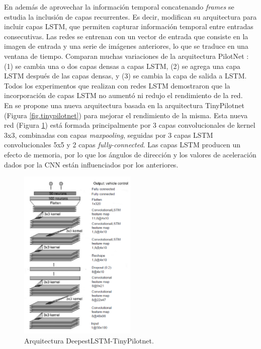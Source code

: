En \cite{pixels} además de aprovechar la información temporal concatenando \textit{frames} se estudia la inclusión de capas recurrentes. Es decir, modifican su arquitectura para incluir capas LSTM, que permiten capturar información temporal entre entradas consecutivas. Las redes se entrenan con un vector de entrada que consiste en la imagen de entrada y una serie de imágenes anteriores, lo que se traduce en una ventana de tiempo. Comparan muchas variaciones de la arquitectura PilotNet \cite{end2end}: (1) se cambia una o dos capas densas a capas LSTM, (2) se agrega una capa LSTM después de las capas densas, y (3) se cambia la capa de salida a LSTM. Todos los experimentos que realizan con redes LSTM demostraron que la incorporación de capas LSTM no aumentó ni redujo el rendimiento de la red.\\

En \cite{self-driving} se propone una nueva arquitectura basada en la arquitectura TinyPilotnet (Figura \ref{fig.tinypilotnet}) para mejorar el rendimiento de la misma. Esta nueva red (Figura \ref{fig.deepestlstm}) está formada principalmente por 3 capas convolucionales de kernel 3x3, combinadas con capas \textit{maxpooling}, seguidas por 3 capas LSTM convolucionales 5x5 y 2 capas \textit{fully-connected}. Las capas LSTM producen un efecto de memoria, por lo que los ángulos de dirección y los valores de aceleración dados por la CNN están influenciados por los anteriores. \\

\begin{figure}
\begin{center}
	\includegraphics[width=0.5\textwidth]{figures/Estado_arte/deepestlstm.png}
   \caption{Arquitectura DeepestLSTM-TinyPilotnet.}
	\label{fig.deepestlstm}
\end{center}
\end{figure}


